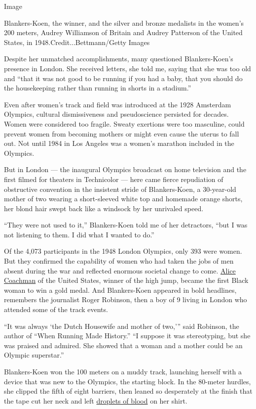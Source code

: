Image

Blankers-Koen, the winner, and the silver and bronze medalists in the
women's 200 meters, Audrey Williamson of Britain and Audrey Patterson of
the United States, in 1948.Credit...Bettmann/Getty Images

Despite her unmatched accomplishments, many questioned Blankers-Koen's
presence in London. She received letters, she told me, saying that she
was too old and ``that it was not good to be running if you had a baby,
that you should do the housekeeping rather than running in shorts in a
stadium.''

Even after women's track and field was introduced at the 1928 Amsterdam
Olympics, cultural dismissiveness and pseudoscience persisted for
decades. Women were considered too fragile. Sweaty exertions were too
masculine, could prevent women from becoming mothers or might even cause
the uterus to fall out. Not until 1984 in Los Angeles was a women's
marathon included in the Olympics.

But in London --- the inaugural Olympics broadcast on home television
and the first filmed for theaters in Technicolor --- here came fierce
repudiation of obstructive convention in the insistent stride of
Blankers-Koen, a 30-year-old mother of two wearing a short-sleeved white
top and homemade orange shorts, her blond hair swept back like a
windsock by her unrivaled speed.

``They were not used to it,'' Blankers-Koen told me of her detractors,
``but I was not listening to them. I did what I wanted to do.''

Of the 4,073 participants in the 1948 London Olympics, only 393 were
women. But they confirmed the capability of women who had taken the jobs
of men absent during the war and reflected enormous societal change to
come.
\href{https://www.nytimes.com/2014/07/15/sports/alice-coachman-90-dies-groundbreaking-medalist.html}{Alice
Coachman} of the United States, winner of the high jump, became the
first Black woman to win a gold medal. And Blankers-Koen appeared in
bold headlines, remembers the journalist Roger Robinson, then a boy of 9
living in London who attended some of the track events.

``It was always `the Dutch Housewife and mother of two,''' said
Robinson, the author of ``When Running Made History.'' ``I suppose it
was stereotyping, but she was praised and admired. She showed that a
woman and a mother could be an Olympic superstar.''

Blankers-Koen won the 100 meters on a muddy track, launching herself
with a device that was new to the Olympics, the starting block. In the
80-meter hurdles, she clipped the fifth of eight barriers, then leaned
so desperately at the finish that the tape cut her neck and left
\href{https://www.theguardian.com/sport/blog/2012/jan/18/fanny-blankers-koen-olympic-moments}{droplets
of blood} on her shirt.

